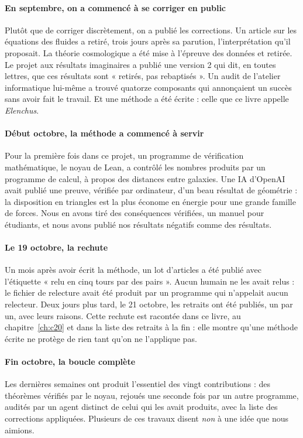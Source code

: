 \paragraph{En septembre, on a commencé à se corriger en public} Plutôt que de corriger discrètement, on a publié les
corrections. Un article sur les équations des fluides a retiré, trois jours après sa parution, l'interprétation qu'il
proposait. La théorie cosmologique a été mise à l'épreuve des données et retirée. Le projet aux résultats imaginaires
a publié une version 2 qui dit, en toutes lettres, que ces résultats sont « retirés, pas rebaptisés ». Un audit de
l'atelier informatique lui-même a trouvé quatorze composants qui annonçaient un succès sans avoir fait le travail.
Et une méthode a été écrite : celle que ce livre appelle \emph{Elenchus}.

\paragraph{Début octobre, la méthode a commencé à servir} Pour la première fois dans ce projet, un programme de vérification
mathématique, le noyau de Lean, a contrôlé les nombres produits par un programme de calcul, à propos des distances
entre galaxies. Une IA d'OpenAI avait publié une preuve, vérifiée par ordinateur, d'un beau résultat de géométrie :
la disposition en triangles est la plus économe en énergie pour une grande famille de forces. Nous en avons tiré des
conséquences vérifiées, un manuel pour étudiants, et nous avons publié nos résultats négatifs comme des résultats.

\paragraph{Le 19 octobre, la rechute} Un mois après avoir écrit la méthode, un lot d'articles a été publié avec
l'étiquette « relu en cinq tours par des pairs ». Aucun humain ne les avait relus : le fichier de relecture avait été
produit par un programme qui n'appelait aucun relecteur. Deux jours plus tard, le 21 octobre, les retraits ont été
publiés, un par un, avec leurs raisons. Cette rechute est racontée dans ce livre, au chapitre~\ref{ch:c20} et dans la
liste des retraits à la fin : elle montre qu'une méthode écrite ne protège de rien tant qu'on ne l'applique pas.

\paragraph{Fin octobre, la boucle complète} Les dernières semaines ont produit l'essentiel des vingt contributions :
des théorèmes vérifiés par le noyau, rejoués une seconde fois par un autre programme, audités par un agent distinct
de celui qui les avait produits, avec la liste des corrections appliquées. Plusieurs de ces travaux disent \emph{non}
à une idée que nous aimions.

